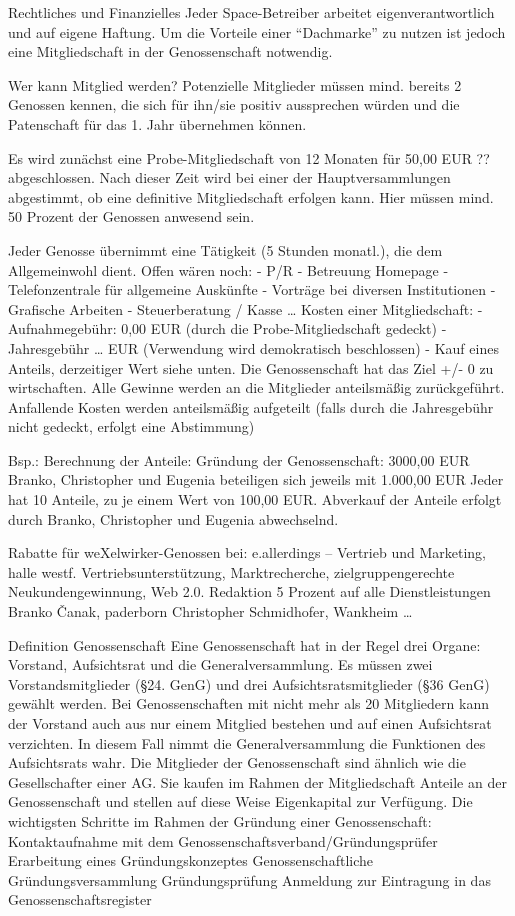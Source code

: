 Rechtliches und Finanzielles
Jeder Space-Betreiber arbeitet eigenverantwortlich und auf eigene Haftung. 
Um die Vorteile einer "`Dachmarke"' zu nutzen ist jedoch eine Mitgliedschaft in der Genossenschaft notwendig.

Wer kann Mitglied werden?
Potenzielle Mitglieder müssen mind. bereits 2 Genossen kennen, die sich für ihn/sie positiv aussprechen würden und die Patenschaft für das 1. Jahr übernehmen können.

Es wird zunächst eine Probe-Mitgliedschaft von 12 Monaten für 50,00 EUR ?? abgeschlossen. Nach dieser Zeit wird bei einer der Hauptversammlungen abgestimmt, ob eine definitive Mitgliedschaft erfolgen kann. Hier müssen mind. 50 Prozent der Genossen anwesend sein.

Jeder Genosse übernimmt eine Tätigkeit (5 Stunden monatl.), die dem Allgemeinwohl dient. Offen wären noch:
- P/R
- Betreuung Homepage
- Telefonzentrale für allgemeine Auskünfte
- Vorträge bei diversen Institutionen
- Grafische Arbeiten
- Steuerberatung / Kasse
…
Kosten einer Mitgliedschaft:
- Aufnahmegebühr: 0,00 EUR (durch die Probe-Mitgliedschaft gedeckt)
- Jahresgebühr … EUR (Verwendung wird demokratisch beschlossen)
- Kauf eines Anteils, derzeitiger Wert siehe unten.
Die Genossenschaft hat das Ziel +/- 0 zu wirtschaften.
Alle Gewinne werden an die Mitglieder anteilsmäßig zurückgeführt.
Anfallende Kosten werden anteilsmäßig aufgeteilt (falls durch die Jahresgebühr nicht gedeckt, erfolgt eine Abstimmung)

Bsp.: Berechnung der Anteile:
Gründung der Genossenschaft: 3000,00 EUR
Branko, Christopher und Eugenia beteiligen sich jeweils mit 1.000,00 EUR
Jeder hat 10 Anteile, zu je einem Wert von 100,00 EUR.
Abverkauf der Anteile erfolgt durch Branko, Christopher und Eugenia abwechselnd.


Rabatte für weXelwirker-Genossen bei:
e.allerdings – Vertrieb und Marketing, halle westf.
Vertriebsunterstützung, Marktrecherche, zielgruppengerechte Neukundengewinnung, Web 2.0. Redaktion
5 Prozent auf alle Dienstleistungen
Branko Čanak, paderborn
Christopher Schmidhofer, Wankheim
…


 


Definition Genossenschaft
Eine Genossenschaft hat in der Regel drei Organe: Vorstand, Aufsichtsrat und die Generalversammlung. Es müssen zwei Vorstandsmitglieder (\S 24. GenG) und drei Aufsichtsratsmitglieder (\S 36 GenG) gewählt werden. Bei Genossenschaften mit nicht mehr als 20 Mitgliedern kann der Vorstand auch aus nur einem Mitglied bestehen und auf einen Aufsichtsrat verzichten. In diesem Fall nimmt die Generalversammlung die Funktionen des Aufsichtsrats wahr.
Die Mitglieder der Genossenschaft sind ähnlich wie die Gesellschafter einer AG. Sie kaufen im Rahmen der Mitgliedschaft Anteile an der Genossenschaft und stellen auf diese Weise Eigenkapital zur Verfügung.
Die wichtigsten Schritte im Rahmen der Gründung einer Genossenschaft:
Kontaktaufnahme mit dem Genossenschaftsverband/Gründungsprüfer
Erarbeitung eines Gründungskonzeptes
Genossenschaftliche Gründungsversammlung
Gründungsprüfung
Anmeldung zur Eintragung in das Genossenschaftsregister

